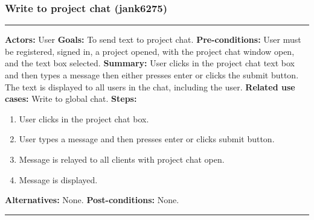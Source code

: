 \documentclass[11pt]{report}
\begin{document}
\subsubsection{Write to project chat (jank6275)}
\vspace{2pt}
\hrule
\vspace{8pt}
 \textbf{Actors:} User \newline
\textbf{Goals:} To send text to project chat. \newline
 \textbf{Pre-conditions:} User must be registered, signed in, a project opened, with the project chat window open, and the text box selected.  \newline
 \textbf{Summary:} User clicks in the project chat text box and then types a message then either presses enter or clicks the submit button. The text is displayed to all users in the chat, including the user. \newline
\textbf{Related use cases:} Write to global chat. \newline
\textbf{Steps:} \begin{enumerate}
  \item User clicks in the project chat box.
  \item User types a message and then presses enter or clicks submit button.
  \item Message is relayed to all clients with project chat open.
  \item Message is displayed.
 \end{enumerate}
 \textbf{Alternatives:} None. \newline
 \textbf{Post-conditions:} None. \newline
\vspace{8pt}
\hrule
\newpage
\end{document}
